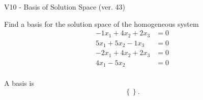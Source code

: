 \begin{exercise}
  \begin{exerciseTitle}V10 - Basis of Solution Space (ver. 43)\end{exerciseTitle}
  \begin{exerciseStatement}
    Find a basis for the solution space of the homogeneous system 
\begin{align*}
 -1 x_ 1 + 4 x_ 2 + 2 x_ 3 &= 0  \\ 
  5 x_ 1 + 5 x_ 2 -1 x_ 3 &= 0  \\ 
  -2 x_ 1 + 4 x_ 2 + 2 x_ 3 &= 0  \\ 
  4 x_ 1 -5 x_ 2 &= 0  \\ 
 \end{align*}


 
  \end{exerciseStatement}

  \begin{exerciseAnswer}
   A basis is   
\[\left\{\right\}.\]

  


  \end{exerciseAnswer}
\end{exercise}